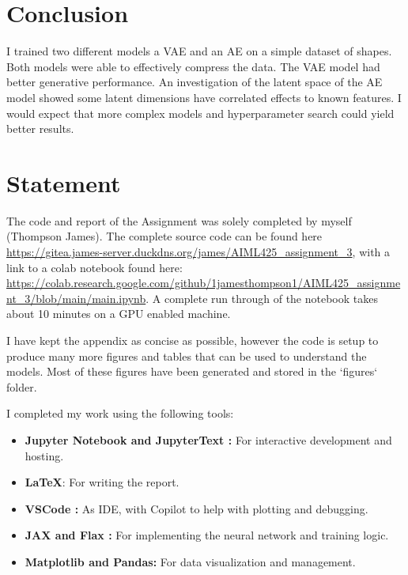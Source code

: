 \documentclass[conference,a4paper]{IEEEtran}
\begin{document}
\section{Conclusion}

I trained two different models a VAE and an AE on a simple dataset of shapes. Both models were able to effectively compress the data. The VAE model had better generative performance. An investigation of the latent space of the AE model showed some latent dimensions have correlated effects to known features. I would expect that more complex models and hyperparameter search could yield better results.

\newpage
\section*{Statement}

The code and report of the Assignment was solely completed by myself (Thompson James). The complete source code can be found here \url{https://gitea.james-server.duckdns.org/james/AIML425\_assignment\_3}, with a link to a colab notebook found here: \url{https://colab.research.google.com/github/1jamesthompson1/AIML425_assignment_3/blob/main/main.ipynb}. A complete run through of the notebook takes about 10 minutes on a GPU enabled machine.

I have kept the appendix as concise as possible, however the code is setup to produce many more figures and tables that can be used to understand the models. Most of these figures have been generated and stored in the `figures` folder.

I completed my work using the following tools:
\begin{itemize}
    \item \textbf{Jupyter Notebook \cite{Kluyver2016jupyter} and JupyterText \cite{woutsMwoutsJupytext2025}:} For interactive development and hosting.
    \item \textbf{\LaTeX}: For writing the report.
    \item \textbf{VSCode \cite{MicrosoftVscode2025}:} As IDE, with Copilot to help with plotting and debugging.
    \item \textbf{JAX \cite{jax2018github} and Flax \cite{flax2020github}:} For implementing the neural network and training logic.
    \item \textbf{Matplotlib\cite{Hunter:2007} and Pandas\cite{thepandasdevelopmentteamPandasdevPandasPandas}:} For data visualization and management.
\end{itemize}
\end{document}
